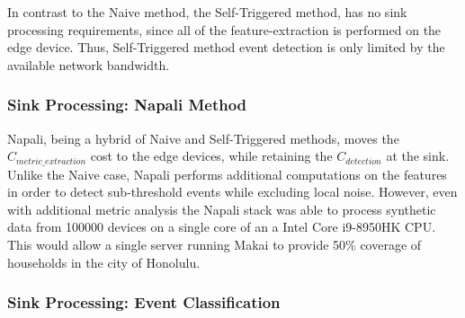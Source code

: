 In contrast to the Naive method, the Self-Triggered method, has no sink processing requirements, since all of the feature-extraction is performed on the edge device.
Thus, Self-Triggered method event detection is only limited by the available network bandwidth.

\subsubsection{Sink Processing: Napali Method}

Napali, being a hybrid of Naive and Self-Triggered methods, moves the $C_{metric\_extraction}$ cost to the edge devices, while retaining
the $C_{detection}$ at the sink.
Unlike the Naive case, Napali performs additional computations on the features in order to detect sub-threshold events while excluding local noise.
However, even with additional metric analysis the Napali stack was able to process synthetic data from 100000 devices on a single core of an a Intel Core i9-8950HK CPU.
This would allow a single server running Makai to provide 50\% coverage of households in the city of Honolulu.

\subsubsection{Sink Processing: Event Classification}


